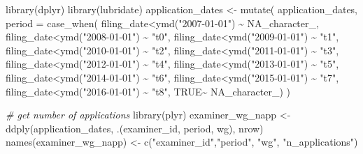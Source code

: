 \documentclass[
]{article}
\newenvironment{Shaded}{\begin{snugshade}}{\end{snugshade}}
\newcommand{\AttributeTok}[1]{\textcolor[rgb]{0.77,0.63,0.00}{#1}}
\newcommand{\CommentTok}[1]{\textcolor[rgb]{0.56,0.35,0.01}{\textit{#1}}}
\newcommand{\ConstantTok}[1]{\textcolor[rgb]{0.00,0.00,0.00}{#1}}
\newcommand{\FunctionTok}[1]{\textcolor[rgb]{0.00,0.00,0.00}{#1}}
\newcommand{\NormalTok}[1]{#1}
\newcommand{\OtherTok}[1]{\textcolor[rgb]{0.56,0.35,0.01}{#1}}
\newcommand{\SpecialCharTok}[1]{\textcolor[rgb]{0.00,0.00,0.00}{#1}}
\newcommand{\StringTok}[1]{\textcolor[rgb]{0.31,0.60,0.02}{#1}}
\begin{document}
\begin{Shaded}
\begin{Highlighting}[]
\FunctionTok{library}\NormalTok{(dplyr)}
\FunctionTok{library}\NormalTok{(lubridate)}
\NormalTok{application\_dates }\OtherTok{\textless{}{-}} \FunctionTok{mutate}\NormalTok{(}
\NormalTok{  application\_dates,}
  \AttributeTok{period =} \FunctionTok{case\_when}\NormalTok{(}
\NormalTok{    filing\_date}\SpecialCharTok{\textless{}}\FunctionTok{ymd}\NormalTok{(}\StringTok{"2007{-}01{-}01"}\NormalTok{) }\SpecialCharTok{\textasciitilde{}} \ConstantTok{NA\_character\_}\NormalTok{,}
\NormalTok{    filing\_date}\SpecialCharTok{\textless{}}\FunctionTok{ymd}\NormalTok{(}\StringTok{"2008{-}01{-}01"}\NormalTok{) }\SpecialCharTok{\textasciitilde{}} \StringTok{"t0"}\NormalTok{,}
\NormalTok{    filing\_date}\SpecialCharTok{\textless{}}\FunctionTok{ymd}\NormalTok{(}\StringTok{"2009{-}01{-}01"}\NormalTok{) }\SpecialCharTok{\textasciitilde{}} \StringTok{"t1"}\NormalTok{,}
\NormalTok{    filing\_date}\SpecialCharTok{\textless{}}\FunctionTok{ymd}\NormalTok{(}\StringTok{"2010{-}01{-}01"}\NormalTok{) }\SpecialCharTok{\textasciitilde{}} \StringTok{"t2"}\NormalTok{,}
\NormalTok{    filing\_date}\SpecialCharTok{\textless{}}\FunctionTok{ymd}\NormalTok{(}\StringTok{"2011{-}01{-}01"}\NormalTok{) }\SpecialCharTok{\textasciitilde{}} \StringTok{"t3"}\NormalTok{,}
\NormalTok{    filing\_date}\SpecialCharTok{\textless{}}\FunctionTok{ymd}\NormalTok{(}\StringTok{"2012{-}01{-}01"}\NormalTok{) }\SpecialCharTok{\textasciitilde{}} \StringTok{"t4"}\NormalTok{,}
\NormalTok{    filing\_date}\SpecialCharTok{\textless{}}\FunctionTok{ymd}\NormalTok{(}\StringTok{"2013{-}01{-}01"}\NormalTok{) }\SpecialCharTok{\textasciitilde{}} \StringTok{"t5"}\NormalTok{,}
\NormalTok{    filing\_date}\SpecialCharTok{\textless{}}\FunctionTok{ymd}\NormalTok{(}\StringTok{"2014{-}01{-}01"}\NormalTok{) }\SpecialCharTok{\textasciitilde{}} \StringTok{"t6"}\NormalTok{,}
\NormalTok{    filing\_date}\SpecialCharTok{\textless{}}\FunctionTok{ymd}\NormalTok{(}\StringTok{"2015{-}01{-}01"}\NormalTok{) }\SpecialCharTok{\textasciitilde{}} \StringTok{"t7"}\NormalTok{,}
\NormalTok{    filing\_date}\SpecialCharTok{\textless{}}\FunctionTok{ymd}\NormalTok{(}\StringTok{"2016{-}01{-}01"}\NormalTok{) }\SpecialCharTok{\textasciitilde{}} \StringTok{"t8"}\NormalTok{,}
    \ConstantTok{TRUE}\SpecialCharTok{\textasciitilde{}} \ConstantTok{NA\_character\_}\NormalTok{)}
\NormalTok{  )}

\CommentTok{\# get number of applications}
\FunctionTok{library}\NormalTok{(plyr)}
\NormalTok{examiner\_wg\_napp }\OtherTok{\textless{}{-}} \FunctionTok{ddply}\NormalTok{(application\_dates, .(examiner\_id, period, wg), nrow)}
\FunctionTok{names}\NormalTok{(examiner\_wg\_napp) }\OtherTok{\textless{}{-}} \FunctionTok{c}\NormalTok{(}\StringTok{"examiner\_id"}\NormalTok{,}\StringTok{"period"}\NormalTok{, }\StringTok{"wg"}\NormalTok{, }\StringTok{"n\_applications"}\NormalTok{)}


\end{Highlighting}
\end{Shaded}
\end{document}
